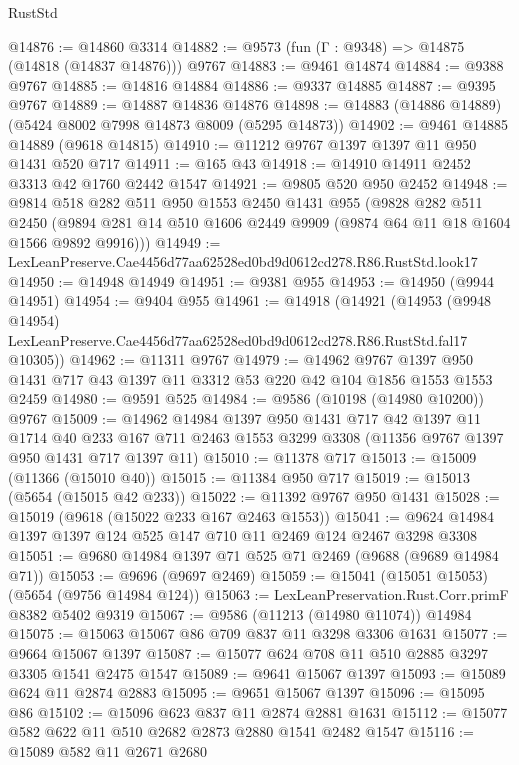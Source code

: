 \begin{lexlean}{RustStd}
\begin{coremodule}
@14876 := @14860 @3314
@14882 := @9573 (fun (Γ : @9348) => @14875 (@14818 (@14837 @14876))) @9767
@14883 := @9461 @14874
@14884 := @9388 @9767
@14885 := @14816 @14884
@14886 := @9337 @14885
@14887 := @9395 @9767
@14889 := @14887 @14836 @14876
@14898 := @14883 (@14886 @14889) (@5424 @8002 @7998 @14873 @8009 (@5295 @14873))
@14902 := @9461 @14885 @14889 (@9618 @14815)
@14910 := @11212 @9767 @1397 @1397 @11 @950 @1431 @520 @717
@14911 := @165 @43
@14918 := @14910 @14911 @2452 @3313 @42 @1760 @2442 @1547
@14921 := @9805 @520 @950 @2452
@14948 := @9814
    @518
    @282
    @511
    @950
    @1553
    @2450
    @1431
    @955
    (@9828
      @282
      @511
      @2450
      (@9894 @281 @14 @510 @1606 @2449 @9909 (@9874 @64 @11 @18 @1604 @1566 @9892 @9916)))
@14949 := LexLeanPreserve.Cae4456d77aa62528ed0bd9d0612cd278.R86.RustStd.look17
@14950 := @14948 @14949
@14951 := @9381 @955
@14953 := @14950 (@9944 @14951)
@14954 := @9404 @955
@14961 := @14918
    (@14921
      (@14953
        (@9948 @14954)
        LexLeanPreserve.Cae4456d77aa62528ed0bd9d0612cd278.R86.RustStd.fal17
        @10305))
@14962 := @11311 @9767
@14979 := @14962
    @9767
    @1397
    @950
    @1431
    @717
    @43
    @1397
    @11
    @3312
    @53
    @220
    @42
    @104
    @1856
    @1553
    @1553
    @2459
@14980 := @9591 @525
@14984 := @9586 (@10198 (@14980 @10200)) @9767
@15009 := @14962
    @14984
    @1397
    @950
    @1431
    @717
    @42
    @1397
    @11
    @1714
    @40
    @233
    @167
    @711
    @2463
    @1553
    @3299
    @3308
    (@11356 @9767 @1397 @950 @1431 @717 @1397 @11)
@15010 := @11378 @717
@15013 := @15009 (@11366 (@15010 @40))
@15015 := @11384 @950 @717
@15019 := @15013 (@5654 (@15015 @42 @233))
@15022 := @11392 @9767 @950 @1431
@15028 := @15019 (@9618 (@15022 @233 @167 @2463 @1553))
@15041 := @9624 @14984 @1397 @1397 @124 @525 @147 @710 @11 @2469 @124 @2467 @3298 @3308
@15051 := @9680 @14984 @1397 @71 @525 @71 @2469 (@9688 (@9689 @14984 @71))
@15053 := @9696 (@9697 @2469)
@15059 := @15041 (@15051 @15053) (@5654 (@9756 @14984 @124))
@15063 := LexLeanPreservation.Rust.Corr.primF @8382 @5402 @9319
@15067 := @9586 (@11213 (@14980 @11074)) @14984
@15075 := @15063 @15067 @86 @709 @837 @11 @3298 @3306 @1631
@15077 := @9664 @15067 @1397
@15087 := @15077 @624 @708 @11 @510 @2885 @3297 @3305 @1541 @2475 @1547
@15089 := @9641 @15067 @1397
@15093 := @15089 @624 @11 @2874 @2883
@15095 := @9651 @15067 @1397
@15096 := @15095 @86
@15102 := @15096 @623 @837 @11 @2874 @2881 @1631
@15112 := @15077 @582 @622 @11 @510 @2682 @2873 @2880 @1541 @2482 @1547
@15116 := @15089 @582 @11 @2671 @2680

\end{coremodule}
\end{lexlean}
